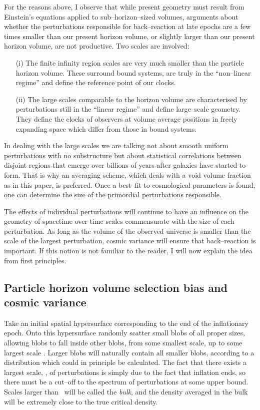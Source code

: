 \documentclass[12pt]{iopart}
\begin{document}
For the reasons above, I observe that while present geometry must result
from Einstein's equations applied to sub--horizon--sized volumes, arguments
about whether the perturbations responsible for back--reaction at late
epochs are a few times smaller than our present horizon volume, or slightly
larger than our present horizon volume, are not productive. Two scales are
involved:
\begin{itemize}
\item[(i)] The finite infinity region scales are very much smaller
than the particle horizon volume. These surround bound systems,
are truly in the ``non--linear regime'' and define the reference point of
our clocks.
\item[(ii)] The large scales comparable to the horizon volume are
characterised by perturbations still in the ``linear regime'' and define
large--scale geometry. They define the clocks of observers at volume average
positions in freely expanding space which differ from those in bound systems.
\end{itemize}
In dealing with the large scales we are talking not about smooth
uniform perturbations with no substructure but about statistical
correlations between disjoint regions that emerge over billions of years
after galaxies have started to form. That
is why an averaging scheme, which deals with a void volume fraction as
in this paper, is preferred. Once a best--fit to cosmological parameters
is found, one can determine the size of the primordial perturbations
responsible.

The effects of individual perturbations will continue to have an influence on
the geometry of spacetime over time scales commensurate with the size of each
perturbation. As long as the volume of the observed universe is smaller
than the scale of the largest perturbation, cosmic variance will ensure that
back--reaction is important. If this notion is not familiar to the
reader, I will now explain the idea from first principles.

\subsection{Particle horizon volume selection bias and cosmic variance}

Take an initial spatial
hypersurface corresponding to the end of the inflationary epoch. Onto this
hypersurface randomly scatter small blobs of all proper sizes, allowing
blobs to fall inside other blobs, from some
smallest scale, up to some largest scale \BB. Larger blobs
will naturally contain all smaller blobs, according to a distribution
which could in principle be calculated. The fact that there exists a
largest scale, \BB, of perturbations is simply due to the fact that
inflation ends, so there must be a cut--off to the spectrum of
perturbations at some upper bound. Scales larger than \BB\
will be called the {\em bulk}, and the density averaged in the bulk
will be extremely close to the true critical density.
\end{document}
